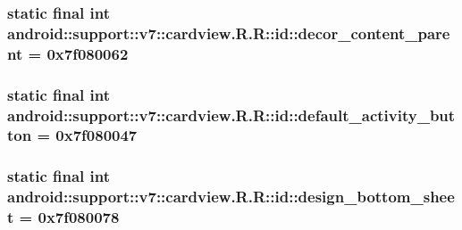 \hypertarget{classandroid_1_1support_1_1v7_1_1cardview_1_1_r_1_1id_e9cc5c6aa3f856b65da30a735e3a218b}{
\subsubsection[{decor\_\-content\_\-parent}]{\setlength{\rightskip}{0pt plus 5cm}static final int android::support::v7::cardview.R.R::id::decor\_\-content\_\-parent = 0x7f080062}}
\label{classandroid_1_1support_1_1v7_1_1cardview_1_1_r_1_1id_e9cc5c6aa3f856b65da30a735e3a218b}


\hypertarget{classandroid_1_1support_1_1v7_1_1cardview_1_1_r_1_1id_dd336ab460f5839d24cf43e2c7ca1647}{
\subsubsection[{default\_\-activity\_\-button}]{\setlength{\rightskip}{0pt plus 5cm}static final int android::support::v7::cardview.R.R::id::default\_\-activity\_\-button = 0x7f080047}}
\label{classandroid_1_1support_1_1v7_1_1cardview_1_1_r_1_1id_dd336ab460f5839d24cf43e2c7ca1647}


\hypertarget{classandroid_1_1support_1_1v7_1_1cardview_1_1_r_1_1id_6b9fc477534a5ad15cb80c6a23f3015d}{
\subsubsection[{design\_\-bottom\_\-sheet}]{\setlength{\rightskip}{0pt plus 5cm}static final int android::support::v7::cardview.R.R::id::design\_\-bottom\_\-sheet = 0x7f080078}}
\label{classandroid_1_1support_1_1v7_1_1cardview_1_1_r_1_1id_6b9fc477534a5ad15cb80c6a23f3015d}


